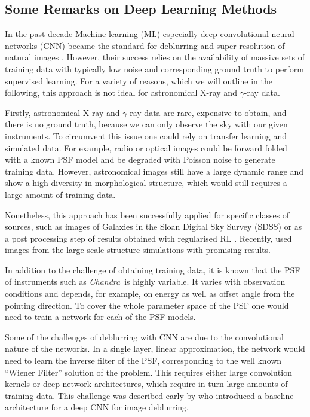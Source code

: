 \documentclass[twocolumn]{aastex631}
\newcommand{\chandra}{\textit{Chandra}~}
\newcommand{\gammaray}{$\gamma$-ray\xspace}
\newcommand{\xray}{X-ray\xspace}
\begin{document}
    \subsection{Some Remarks on Deep Learning Methods}
    In the past decade Machine learning (ML) especially deep convolutional neural networks (CNN) became the standard for deblurring and super-resolution of natural images \citep{Zhang2022}. However, their success relies on the availability of massive sets of training data with typically low noise and corresponding ground truth to perform supervised learning. For a variety of reasons, which we will outline in the following, this approach is not ideal for astronomical \xray and \gammaray data.
    
    Firstly, astronomical \xray and \gammaray data are rare, expensive to obtain, and there is no ground truth, because we can only observe the sky with our given instruments. To circumvent this issue one could rely on transfer learning and simulated data. For example, radio or optical images could be forward folded with a known PSF model and be degraded with Poisson noise to generate training data. However, astronomical images still 
    have a large dynamic range and show a high diversity in morphological structure, which would still requires a large amount of training data. 

    Nonetheless, this approach has been successfully applied for specific classes of sources, such as images of Galaxies in the Sloan Digital Sky Survey (SDSS) \citep{Schawinski2017} or as a post processing step of results obtained with regularised RL \citep{Akhaury2022}. Recently, \cite{Sweere2022} used images from the large scale structure simulations with promising results.

    In addition to the challenge of obtaining training data, it is known that the PSF of instruments such as \chandra is highly variable. It varies with observation conditions and depends, for example, on energy as well as offset angle from the pointing direction. To cover the whole parameter space of the PSF one would need to train a network for each of the PSF models.

    Some of the challenges of deblurring with CNN are due to the convolutional nature of the networks. In a single layer, linear approximation, the network would need to learn the inverse filter of the PSF, corresponding to the well known \enquote{Wiener Filter} solution of the problem. This requires either large convolution kernels or deep network architectures, which require in turn large amounts of training data. This challenge was described early by \cite{Li2014} who introduced a baseline architecture for a deep CNN for image deblurring.
    
\end{document}
